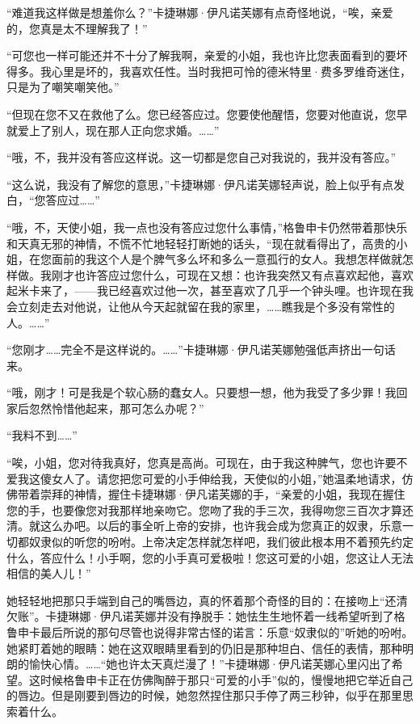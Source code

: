 \par “难道我这样做是想羞你么？”卡捷琳娜·伊凡诺芙娜有点奇怪地说，“唉，亲爱的，您真是太不理解我了！”
\par “可您也一样可能还并不十分了解我啊，亲爱的小姐，我也许比您表面看到的要坏得多。我心里是坏的，我喜欢任性。当时我把可怜的德米特里·费多罗维奇迷住，只是为了嘲笑嘲笑他。”
\par “但现在您不又在救他了么。您已经答应过。您要使他醒悟，您要对他直说，您早就爱上了别人，现在那人正向您求婚。……”
\par “哦，不，我并没有答应这样说。这一切都是您自己对我说的，我并没有答应。”
\par “这么说，我没有了解您的意思，”卡捷琳娜·伊凡诺芙娜轻声说，脸上似乎有点发白，“您答应过……”
\par “哦，不，天使小姐，我一点也没有答应过您什么事情，”格鲁申卡仍然带着那快乐和天真无邪的神情，不慌不忙地轻轻打断她的话头，“现在就看得出了，高贵的小姐，在您面前的我这个人是个脾气多么坏和多么一意孤行的女人。我想怎样做就怎样做。我刚才也许答应过您什么，可现在又想：也许我突然又有点喜欢起他，喜欢起米卡来了，——我已经喜欢过他一次，甚至喜欢了几乎一个钟头哩。也许现在我会立刻走去对他说，让他从今天起就留在我的家里，……瞧我是个多没有常性的人。……”
\par “您刚才……完全不是这样说的。……”卡捷琳娜·伊凡诺芙娜勉强低声挤出一句话来。
\par “哦，刚才！可是我是个软心肠的蠢女人。只要想一想，他为我受了多少罪！我回家后忽然怜惜他起来，那可怎么办呢？”
\par “我料不到……”
\par “唉，小姐，您对待我真好，您真是高尚。可现在，由于我这种脾气，您也许要不爱我这傻女人了。请您把您可爱的小手伸给我，天使似的小姐，”她温柔地请求，仿佛带着崇拜的神情，握住卡捷琳娜·伊凡诺芙娜的手，“亲爱的小姐，我现在握住您的手，也要像您对我那样地亲吻它。您吻了我的手三次，我得吻您三百次才算还清。就这么办吧。以后的事全听上帝的安排，也许我会成为您真正的奴隶，乐意一切都奴隶似的听您的吩咐。上帝决定怎样就怎样吧，我们彼此根本用不着预先约定什么，答应什么！小手啊，您的小手真可爱极啦！您这可爱的小姐，您这让人无法相信的美人儿！”
\par 她轻轻地把那只手端到自己的嘴唇边，真的怀着那个奇怪的目的：在接吻上“还清欠账”。卡捷琳娜·伊凡诺芙娜并没有挣脱手：她怯生生地怀着一线希望听到了格鲁申卡最后所说的那句尽管也说得非常古怪的诺言：乐意“奴隶似的”听她的吩咐。她紧盯着她的眼睛：她在这双眼睛里看到的仍旧是那种坦白、信任的表情，那种明朗的愉快心情。……“她也许太天真烂漫了！”卡捷琳娜·伊凡诺芙娜心里闪出了希望。这时候格鲁申卡正在仿佛陶醉于那只“可爱的小手”似的，慢慢地把它举近自己的唇边。但是刚要到唇边的时候，她忽然捏住那只手停了两三秒钟，似乎在那里思索着什么。
